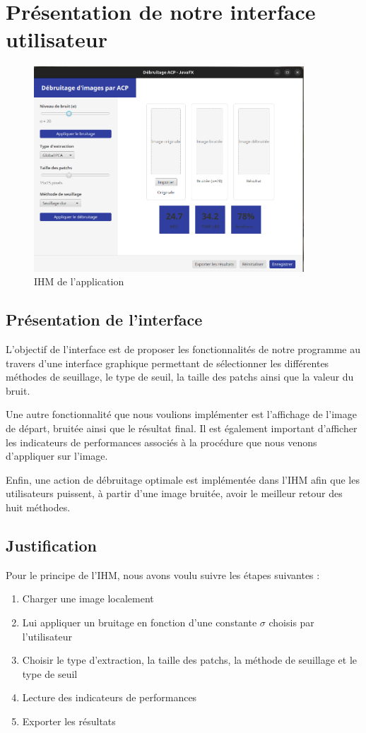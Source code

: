 \section{Présentation de notre interface utilisateur}
\begin{figure}[hbt!]
    \centering
    \includegraphics[trim=0cm 0cm 0.5cm 1.5cm, clip, width=0.9\textwidth]{reference/picture/maquette.png}
    \caption{IHM de l'application}
\end{figure}
\subsection{Présentation de l'interface}
L'objectif de l'interface est de proposer les fonctionnalités de notre programme au travers d'une interface graphique permettant de sélectionner les différentes méthodes de seuillage, le type de seuil, la taille des patchs ainsi que la valeur du bruit. \par
Une autre fonctionnalité que nous voulions implémenter est l'affichage de l'image de départ, bruitée ainsi que le résultat final. Il est également important d'afficher les indicateurs de performances associés à la procédure que nous venons d'appliquer sur l'image. \par
Enfin, une action de débruitage optimale est implémentée dans l'IHM afin que les utilisateurs puissent, à partir d'une image bruitée, avoir le meilleur retour des huit méthodes.
\subsection{Justification}
Pour le principe de l'IHM, nous avons voulu suivre les étapes suivantes :
\begin{enumerate}
    \item Charger une image localement
    \item Lui appliquer un bruitage en fonction d'une constante \(\sigma\) choisis par l’utilisateur
    \item Choisir le type d'extraction, la taille des patchs, la méthode de seuillage et le type de seuil
    \item Lecture des indicateurs de performances
    \item Exporter les résultats
\end{enumerate}

